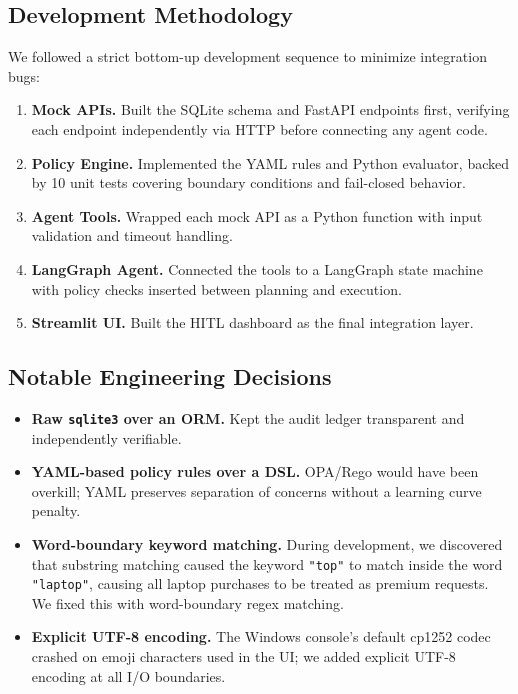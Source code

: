 \documentclass[11pt,a4paper]{article}
\begin{document}
\subsection{Development Methodology}

We followed a strict bottom-up development sequence to minimize integration bugs:

\begin{enumerate}[leftmargin=*, itemsep=2pt]
    \item \textbf{Mock APIs.} Built the SQLite schema and FastAPI endpoints first, verifying each endpoint independently via HTTP before connecting any agent code.
    \item \textbf{Policy Engine.} Implemented the YAML rules and Python evaluator, backed by 10 unit tests covering boundary conditions and fail-closed behavior.
    \item \textbf{Agent Tools.} Wrapped each mock API as a Python function with input validation and timeout handling.
    \item \textbf{LangGraph Agent.} Connected the tools to a LangGraph state machine with policy checks inserted between planning and execution.
    \item \textbf{Streamlit UI.} Built the HITL dashboard as the final integration layer.
\end{enumerate}

\subsection{Notable Engineering Decisions}

\begin{itemize}[leftmargin=*, itemsep=2pt]
    \item \textbf{Raw \texttt{sqlite3} over an ORM.} Kept the audit ledger transparent and independently verifiable.
    \item \textbf{YAML-based policy rules over a DSL.} OPA/Rego would have been overkill; YAML preserves separation of concerns without a learning curve penalty.
    \item \textbf{Word-boundary keyword matching.} During development, we discovered that substring matching caused the keyword \texttt{"top"} to match inside the word \texttt{"laptop"}, causing all laptop purchases to be treated as premium requests. We fixed this with word-boundary regex matching.
    \item \textbf{Explicit UTF-8 encoding.} The Windows console's default cp1252 codec crashed on emoji characters used in the UI; we added explicit UTF-8 encoding at all I/O boundaries.
\end{itemize}
\end{document}
